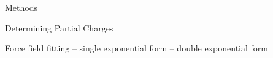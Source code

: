 \begin{section}{Methods}
\label{sec:lmoeda-methods}

Determining Partial Charges

Force field fitting
    -- single exponential form
    -- double exponential form

\end{section}
